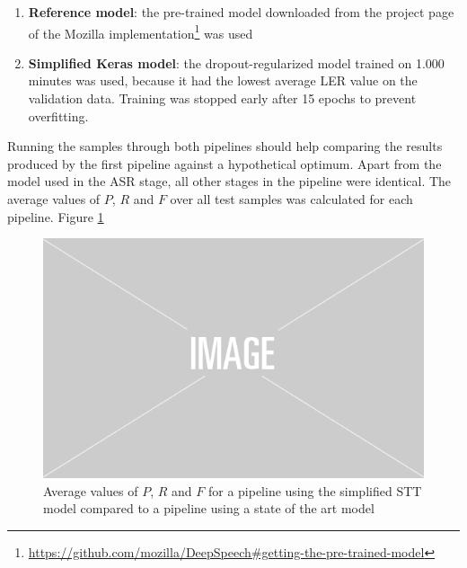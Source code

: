 \begin{enumerate}
	\item \textbf{Reference model}: the pre-trained model downloaded from the project page of the Mozilla implementation\footnote{\url{https://github.com/mozilla/DeepSpeech\#getting-the-pre-trained-model}} was used	
	\item \textbf{Simplified Keras model}: the dropout-regularized model trained on 1.000 minutes was used, because it had the lowest average \ac{LER} value on the validation data. Training was stopped early after 15 epochs to prevent overfitting. 
\end{enumerate}

Running the samples through both pipelines should help comparing the results produced by the first pipeline against a hypothetical optimum. Apart from the model used in the \ac{ASR} stage, all other stages in the pipeline were identical. The average values of $P$, $R$ and $F$ over all test samples was calculated for each pipeline. Figure \ref{pipeline_boxplot_ls_en} 

\begin{figure}
	\includegraphics[width=\linewidth]{./img/placeholder.png}
	\caption{Average values of $P$, $R$ and $F$ for a pipeline using the simplified \ac{STT} model compared to a pipeline using a state of the art model}
	\label{pipeline_boxplot_ls_en}
\end{figure}

